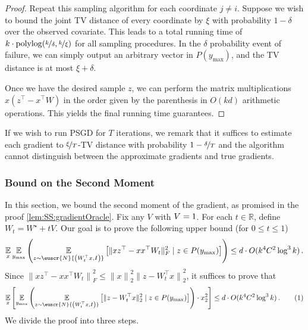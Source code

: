 \documentclass[11pt,letterpaper]{article}
\theoremstyle{plain}
\theoremstyle{definition}
\theoremstyle{remark}
\newcommand{\yesnum}{\addtocounter{equation}{1}\tag{\theequation}}
\newcommand{\inparen}[1]{\ensuremath{\left(#1\right)}}
\newcommand{\insquare}[1]{\ensuremath{\left[#1\right]}}
\newcommand{\snorm}[1]{\ensuremath{\ensuremath{\| #1 \|}}}
\let\norm\relax
\newcommand{\norm}[1]{\ensuremath{\left\lVert #1 \right\rVert}}
\newcommand{\R}{\mathbb{R}}
\newcommand{\E}{\operatornamewithlimits{\mathbb{E}}}
\newcommand{\Ex}{\E}
\newcommand{\nfrac}[2]{\nicefrac{#1}{#2}}
\newcommand{\polylog}{\mathrm{polylog}}
\newcommand{\customcal}[1]{\euscr{#1}}
\newcommand{\cN}{\customcal{N}}
\newcommand{\normal}[2]{\cN{\inparen{#1,#2}}}
\newcommand{\Wstar}{{W^\star}}
\newcommand{\ymax}{y_{\max}}
\begin{document}
{{\begin{proof}
        Repeat this sampling algorithm for each coordinate $j\neq i$.
        Suppose we wish to bound the joint TV distance of every coordinate by $\xi$
        with probability $1-\delta$ over the observed covariate.
        This leads to a total running time of $k\cdot \polylog(\nfrac{k}\delta, \nfrac{k}\xi)$ for all sampling procedures.
        In the $\delta$ probability event of failure,
        we can simply output an arbitrary vector in $P(\ymax)$, and the TV distance is at most $\xi+\delta$.

        Once we have the desired sample $z$,
        we can perform the matrix multiplications $x(z^\top - x^\top W)$ in the order given by the parenthesis in $O(kd)$ arithmetic operations.
        This yields the final running time guarantees. 
    \end{proof}
    If we wish to run PSGD for $T$ iterations,
    we remark that it suffices to estimate each gradient to $\nfrac\xi{T}$-TV distance with probability $1-\nfrac\delta{T}$
    and the algorithm cannot distinguish between the approximate gradients and true gradients.


    \subsubsection{Bound on the Second Moment}\label{sec:SS:secondMoment}
        In this section, we bound the second moment of the gradient, as promised in the proof \cref{lem:SS:gradientOracle}.
        Fix any $V$ with $\norm{V}=1$.
        For each $t\in \R$, define $W_t = \Wstar + tV$.
        Our goal is to prove the following upper bound (for $0\leq t\leq 1$)%
        \[
            \Ex_x \Ex_{\ymax}
                    \inparen{
                        \Ex_{z\sim \normal{W_t^\top x}{I}}
                        \insquare{
                            \snorm{xz^\top - xx^\top W_t}_F^2 
                            \mid z\in P(\ymax)
                        }
                }
                \leq d\cdot O(k^4 C^2 \log^3{k})\,.
        \]
        Since $\snorm{xz^\top 
            - xx^\top W_t}_F^2 
            \leq 
            \snorm{x}_2^2 \snorm{z 
            - W_t^\top x}_2^2$, it suffices to prove that
        \begin{align*}
            \Ex_x\insquare{
                \Ex_{\ymax}
                \inparen{
                    \Ex_{z\sim \normal{W_t^\top x}{I}}
                    \insquare{
                        \snorm{z - W_t^\top x}_2^2
                        \mid z\in P(\ymax)
                    }
                }
                \cdot \norm{x}_2^2 
            }
            \leq d\cdot O(k^4 C^2 \log^3{k})\,.
            \yesnum\label{eq:SS:SecondMoment:sufficient}
        \end{align*}
        We divide the proof into three steps.

}}
\end{document}
